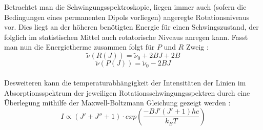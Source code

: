 Betrachtet man die Schwingungsspektroskopie, liegen immer auch (sofern die Bedingungen eines permanenten Dipols vorliegen) angeregte Rotationsniveaus vor. Dies liegt an der höheren benötigten Energie für einen Schwingszustand, der folglich im statistischen Mittel auch rotatorische Niveaus anregen kann. 
\newpage
Fasst man nun die Energietherme zusammen folgt für $P$ und $R$ Zweig :
\begin{equation}
	\tilde{\nu}(R(J))=\tilde{\nu}_0 + 2BJ + 2B
	\label{RotSchR}
\end{equation}
\begin{equation}
\tilde{\nu}(P(J))=\tilde{\nu}_0 - 2BJ
\label{RotSchP}
\end{equation}
\\
Desweiteren kann die temperaturabhängigkeit der Intensitäten der Linien im Absorptionsspektrum der jeweiligen Rotationsschwingungsspektren durch eine Überlegung mithilfe der Maxwell-Boltzmann Gleichung gezeigt werden : \\
\begin{equation}
I \propto (J'+J''+1)\cdot exp (\frac{-BJ'(J'+1)hc}{k_BT})
\label{TA}
\end{equation}


%